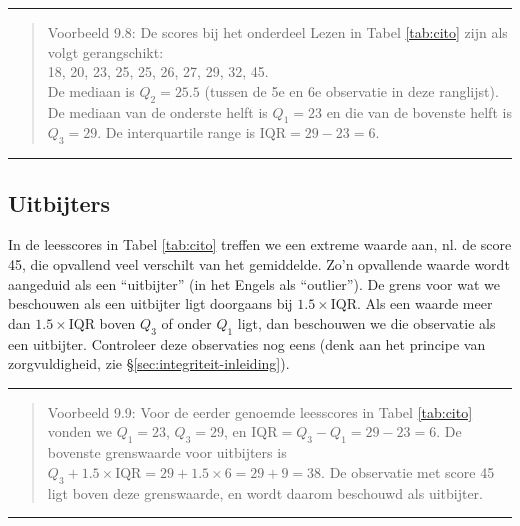 \documentclass[
]{book}
\begin{document}
\begin{center}\rule{0.5\linewidth}{0.5pt}\end{center}

\begin{quote}
Voorbeeld 9.8:
De scores bij het onderdeel Lezen in
Tabel \ref{tab:cito} zijn
als volgt gerangschikt:\\
18, 20, 23, 25, 25, 26, 27, 29, 32, 45.\\
De mediaan is \(Q_2=25.5\) (tussen de 5e en 6e observatie in deze
ranglijst). De mediaan van de onderste helft is \(Q_1=23\) en die van de
bovenste helft is \(Q_3=29\). De interquartile range is
\(\textrm{IQR}=29-23=6\).
\end{quote}

\begin{center}\rule{0.5\linewidth}{0.5pt}\end{center}

\hypertarget{sec:uitbijters}{%
\subsection{Uitbijters}\label{sec:uitbijters}}

In de leesscores in Tabel \ref{tab:cito} treffen we een extreme waarde aan, nl. de score
45, die opvallend veel verschilt van het gemiddelde. Zo'n opvallende
waarde wordt aangeduid als een ``uitbijter'' (in het Engels als
``outlier''). De grens voor wat we beschouwen als een uitbijter ligt
doorgaans bij \(1.5 \times \textrm{IQR}\). Als een waarde meer dan
\(1.5 \times \textrm{IQR}\) boven \(Q_3\) of onder \(Q_1\) ligt, dan
beschouwen we die observatie als een uitbijter. Controleer deze
observaties nog eens (denk aan het principe van zorgvuldigheid, zie
§\ref{sec:integriteit-inleiding}).

\begin{center}\rule{0.5\linewidth}{0.5pt}\end{center}

\begin{quote}
Voorbeeld 9.9:
Voor de eerder genoemde leesscores in
Tabel \ref{tab:cito} vonden
we \(Q_1=23\), \(Q_3=29\), en \(\textrm{IQR}=Q_3-Q_1=29-23=6\). De bovenste
grenswaarde voor uitbijters is
\(Q_3 + 1.5 \times \textrm{IQR} = 29 + 1.5 \times 6 = 29+9 = 38\). De
observatie met score 45 ligt boven deze grenswaarde, en wordt daarom
beschouwd als uitbijter.
\end{quote}

\begin{center}\rule{0.5\linewidth}{0.5pt}\end{center}
\end{document}
